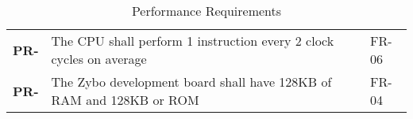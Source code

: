 \resetfyshcounter
\newcommand{\pr}[2]{
	\textbf{PR-\rc} & #1 & #2 \\
	\hline
}
\begin{table}[H]
	\begin{tabularx}{\textwidth}{| a | x | a |}
		\hline
		 &  &  \\
		\hline
		\pr{The CPU shall perform 1 instruction every 2 clock cycles on average}{FR-06}
		\pr{The Zybo development board shall have 128KB of RAM and 128KB or ROM}{FR-04}
	\end{tabularx}
	\caption{Performance Requirements}
\end{table}

